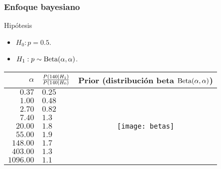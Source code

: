 \documentclass[table]{beamer}
\begin{document}
\begin{frame}
    \frametitle{Enfoque bayesiano}
    \begin{block}{Hipótesis}
        \begin{itemize}
            \item $H_{0}: p = 0.5$.
            \item $H_{1}: p \sim \betadist{\alpha}{\alpha}$.
        \end{itemize}
    \end{block}
    \begin{center}
        \begin{tabular}{r|lc}
            $\alpha$ & $\frac{\prob{140 \mid H_{1}}}{\prob{140 \mid H_{0}}}$ & Prior (distribución beta $\betadist{\alpha}{\alpha}$) \\
            \hline
            $0.37$ & $0.25$ & \multirow{9}{*}{\texttt{[image: betas]}} \\
            $1.00$ & $0.48$ \\
            $2.70$ & $0.82$ \\
            $7.40$ & $1.3$ \\
            $20.00$ & $1.8$ \\
            $55.00$ & $1.9$ \\
            $148.00$ & $1.7$ \\
            $403.00$ & $1.3$ \\
            $1096.00$ & $1.1$
        \end{tabular}
    \end{center}
\end{frame}
\end{document}
